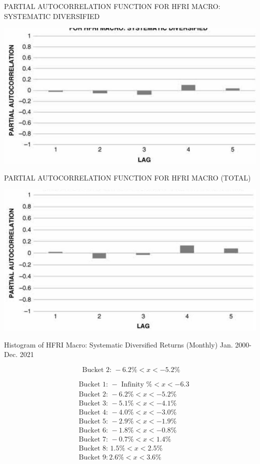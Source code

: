 \documentclass[11pt]{article}
\begin{document}
PARTIAL AUTOCORRELATION FUNCTION FOR HFRI MACRO: SYSTEMATIC DIVERSIFIED

\begin{center}
\includegraphics[max width=\textwidth]{2024_04_09_95e1381b1a9de89facc2g-4(1)}
\end{center}

PARTIAL AUTOCORRELATION FUNCTION FOR HFRI MACRO (TOTAL)

\begin{center}
\includegraphics[max width=\textwidth]{2024_04_09_95e1381b1a9de89facc2g-4}
\end{center}

Histogram of HFRI Macro: Systematic Diversified Returns (Monthly) Jan. 2000-Dec. 2021

$$
\text { Bucket 2: }-6.2 \%<x<-5.2 \%
$$

$$
\begin{aligned}
& \text { Bucket 1: }- \text { Infinity } \%<x<-6.3 \\
& \text { Bucket 2: }-6.2 \%<x<-5.2 \% \\
& \text { Bucket 3: }-5.1 \%<x<-4.1 \% \\
& \text { Bucket 4: }-4.0 \%<x<-3.0 \% \\
& \text { Bucket 5: }-2.9 \%<x<-1.9 \% \\
& \text { Bucket 6: }-1.8 \%<x<-0.8 \% \\
& \text { Bucket 7: }-0.7 \%<x<1.4 \% \\
& \text { Bucket 8: } 1.5 \%<x<2.5 \% \\
& \text { Bucket } 9: 2.6 \%<x<3.6 \%
\end{aligned}
$$
\end{document}
